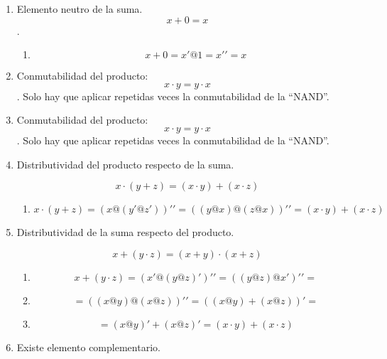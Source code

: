 \documentclass[
]{article}
\providecommand{\tightlist}{%
  \setlength{\itemsep}{0pt}\setlength{\parskip}{0pt}}
\begin{document}
\begin{enumerate}
\begin{enumerate}
\begin{enumerate}
\begin{enumerate}
\begin{enumerate}
          \begin{enumerate}
          \def\labelenumvi{\arabic{enumvi}.}
          \tightlist
          \item
            \[{{x \cdot 1} = {({x@1})}}{' = {({x@1})}}@{{({x@x'})} =}\]
          \item
            \[{= {({x@1})}}@{1 = x}'@{1 = x}'{' = x}\]
          \end{enumerate}
        \item
          Elemento neutro de la suma. \[{x + 0} = x\].

          \begin{enumerate}
          \def\labelenumvi{\arabic{enumvi}.}
          \tightlist
          \item
            \[{{{x + 0} = {x'@1}} = x}'{' = x}\]
          \end{enumerate}
        \item
          Conmutabilidad del producto: \[{x \cdot y} = {y \cdot x}\].
          Solo hay que aplicar repetidas veces la conmutabilidad de la
          ``NAND''.
        \item
          Conmutabilidad del producto: \[{x \cdot y} = {y \cdot x}\].
          Solo hay que aplicar repetidas veces la conmutabilidad de la
          ``NAND''.
        \item
          Distributividad del producto respecto de la suma.

          \[{x \cdot {({y + z})}} = {{({x \cdot y})} + {({x \cdot z})}}\]

          \begin{enumerate}
          \def\labelenumvi{\arabic{enumvi}.}
          \tightlist
          \item
            \[{{x \cdot {({y + z})}} = {({x@{({y'@z'})}})}}'{' = {({{({y@x})}@{({z@x})}})}}'{' = {{({x \cdot y})} + {({x \cdot z})}}}\]
          \end{enumerate}
        \item
          Distributividad de la suma respecto del producto.

          \[{x + {({y \cdot z})}} = {{({x + y})} \cdot {({x + z})}}\]

          \begin{enumerate}
          \def\labelenumvi{\arabic{enumvi}.}
          \tightlist
          \item
            \[{{x + {({y \cdot z})}} = {({{x'}@{({y@z})}'})}}'{' = {({{({y@z})}@{x'}})}}'{' =}\]
          \item
            \[{= {({{({x@y})}@{({x@z})}})}}'{' = {({{({x@y})} + {({x@z})}})}}{' =}\]
          \item
            \[{= {({x@y})}}{' + {({x@z})}}{' = {{({x \cdot y})} + {({x \cdot z})}}}\]
          \end{enumerate}
        \item
          Existe elemento complementario.


\end{enumerate}
\end{enumerate}
\end{enumerate}
\end{enumerate}
\end{enumerate}
\end{document}
